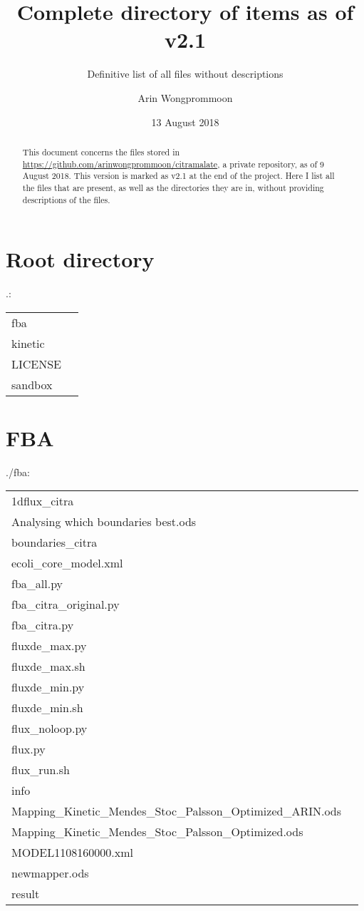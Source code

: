 \documentclass[a4paper, parskip=full]{scrreprt}
\author{Arin Wongprommoon}
\title{Complete directory of items as of v2.1}
\subtitle{Definitive list of all files without descriptions}
\date{13 August 2018}
\begin{document}
\maketitle

\tableofcontents

\begin{abstract}
  This document concerns the files stored in \url{https://github.com/arinwongprommoon/citramalate}, a private repository, as of 9 August 2018. This version is marked as v2.1 at the end of the project. Here I list all the files that are present, as well as the directories they are in, without providing descriptions of the files.
  \end{abstract}

\setlength{\LTleft}{0pt}

\chapter{Root directory}
\label{ch:root}
.:

\begin{longtable}{ll}
fba\\
kinetic\\
LICENSE\\
sandbox
\end{longtable}

\chapter{FBA}
\label{ch:fba}
./fba:

\begin{longtable}{ll}
1dflux\_citra\\
Analysing which boundaries best.ods\\
boundaries\_citra\\
ecoli\_core\_model.xml\\
fba\_all.py\\
fba\_citra\_original.py\\
fba\_citra.py\\
fluxde\_max.py\\
fluxde\_max.sh\\
fluxde\_min.py\\
fluxde\_min.sh\\
flux\_noloop.py\\
flux.py\\
flux\_run.sh\\
info\\
Mapping\_Kinetic\_Mendes\_Stoc\_Palsson\_Optimized\_ARIN.ods\\
Mapping\_Kinetic\_Mendes\_Stoc\_Palsson\_Optimized.ods\\
MODEL1108160000.xml\\
newmapper.ods\\
result
\end{longtable}
\end{document}
